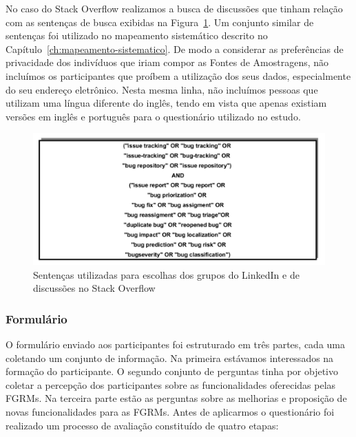 No caso do Stack Overflow realizamos a busca de discussões que tinham relação
com as sentenças de busca exibidas na Figura~\ref{fig:setencas-grupos}. Um
conjunto similar de sentenças foi utilizado no mapeamento sistemático descrito
no Capítulo~\ref{ch:mapeamento-sistematico}. De modo a considerar as
preferências de privacidade dos indivíduos que iriam compor as Fontes de
Amostragens, não incluímos os participantes que proíbem a utilização dos seus
dados, especialmente do seu endereço eletrônico. Nesta mesma linha, não
incluímos pessoas que utilizam uma língua diferente do inglês, tendo em vista
que apenas existiam versões em inglês e português para o questionário utilizado
no estudo.

\begin{figure}[htpb]
	\centering
	\includegraphics[width=0.7\linewidth]{./chapter-pesquisa-com-profissionais/img/setencas-grupos.pdf}
	\caption{Sentenças utilizadas para escolhas dos grupos do LinkedIn e de
		discussões no Stack Overflow}
\label{fig:setencas-grupos}
\end{figure}

\subsubsection{Formulário}
\label{subsubsec:questionario}

O formulário enviado aos participantes foi estruturado em três partes, cada uma
coletando um conjunto de informação. Na primeira estávamos interessados na
formação do participante. O segundo conjunto de perguntas tinha por objetivo
coletar a percepção dos participantes sobre as funcionalidades oferecidas pelas
FGRMs\@. Na terceira parte estão as perguntas sobre as melhorias e proposição de
novas funcionalidades para as FGRMs. Antes de aplicarmos o questionário foi
realizado um processo de avaliação constituído de quatro etapas:

